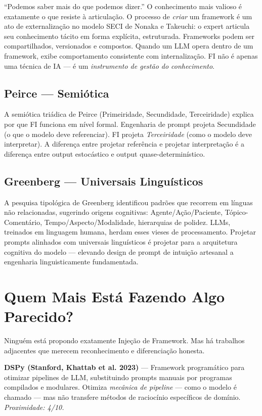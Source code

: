 \documentclass[12pt,a4paper]{article}
\begin{document}
``Podemos saber mais do que podemos dizer.'' O conhecimento mais valioso é exatamente o que resiste à articulação. O processo de \emph{criar} um framework é um ato de externalização no modelo SECI de Nonaka e Takeuchi: o expert articula seu conhecimento tácito em forma explícita, estruturada. Frameworks podem ser compartilhados, versionados e compostos. Quando um LLM opera dentro de um framework, exibe comportamento consistente com internalização. FI não é apenas uma técnica de IA --- é um \emph{instrumento de gestão do conhecimento}.

\subsection{Peirce --- Semiótica}

A semiótica triádica de Peirce (Primeiridade, Secundidade, Terceiridade) explica por que FI funciona em nível formal. Engenharia de prompt projeta Secundidade (o que o modelo deve referenciar). FI projeta \emph{Terceiridade} (como o modelo deve interpretar). A diferença entre projetar referência e projetar interpretação é a diferença entre output estocástico e output quase-determinístico.

\subsection{Greenberg --- Universais Linguísticos}

A pesquisa tipológica de Greenberg identificou padrões que recorrem em línguas não relacionadas, sugerindo origens cognitivas: Agente/Ação/Paciente, Tópico-Comentário, Tempo/Aspecto/Modalidade, hierarquias de polidez. LLMs, treinados em linguagem humana, herdam esses vieses de processamento. Projetar prompts alinhados com universais linguísticos é projetar para a arquitetura cognitiva do modelo --- elevando design de prompt de intuição artesanal a engenharia linguisticamente fundamentada.

\section{Quem Mais Está Fazendo Algo Parecido?}
\label{sec:trabalhos-relacionados}

Ninguém está propondo exatamente Injeção de Framework. Mas há trabalhos adjacentes que merecem reconhecimento e diferenciação honesta.

\textbf{DSPy (Stanford, Khattab et al. 2023)} --- Framework programático para otimizar pipelines de LLM, substituindo prompts manuais por programas compilados e modulares. Otimiza \emph{mecânica de pipeline} --- como o modelo é chamado --- mas não transfere métodos de raciocínio específicos de domínio. \emph{Proximidade: 4/10.}
\end{document}

